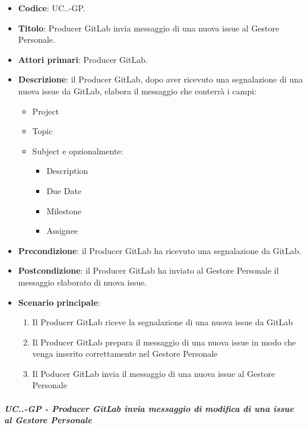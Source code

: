 			\begin{itemize}
				\item \textbf{Codice}: UC\theuccount.\thesubuccount.\thesubsubuccount-GP.
				\item \textbf{Titolo}: Producer GitLab invia messaggio di una nuova issue al Gestore Personale.
				\item \textbf{Attori primari}: Producer GitLab.
				\item \textbf{Descrizione}: il Producer GitLab, dopo aver ricevuto una segnalazione di una nuova issue da GitLab, elabora il messaggio che conterrà i campi:
				\begin{itemize}
					\item Project
					\item Topic
					\item Subject e opzionalmente:
					\begin{itemize}
						\item Description
						\item Due Date
						\item Milestone
						\item Assignee
					\end{itemize}
				\end{itemize}
				\item \textbf{Precondizione}: il Producer GitLab ha ricevuto una segnalazione da GitLab.
				\item \textbf{Postcondizione}: il Producer GitLab ha inviato al Gestore Personale il messaggio   \newline elaborato di nuova issue.
				\item \textbf{Scenario principale}: 
				\begin{enumerate}
					\item Il Producer GitLab riceve la segnalazione di una nuova issue da GitLab
					\item Il Producer GitLab prepara il messaggio di una nuova issue in modo che venga inserito correttamente nel Gestore Personale
					\item Il Poducer GitLab invia il messaggio di una nuova issue al Gestore Personale
				\end{enumerate}
				
			\end{itemize}
		
		\subparagraph{UC\theuccount.\thesubuccount.\thesubsubuccount-GP - Producer GitLab invia messaggio di modifica di una issue al Gestore Personale}
			
